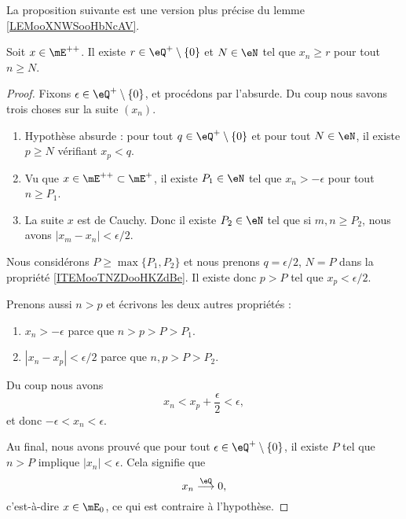 La proposition suivante est une version plus précise du lemme \ref{LEMooXNWSooHbNcAV}.
\begin{proposition}
	Soit \( x\in \mE^{++}\). Il existe \( r\in \eQ^+\setminus\{ 0 \}\) et \( N\in \eN\) tel que \( x_n\geq r\) pour tout \( n\geq N\).
\end{proposition}

\begin{proof}
	Fixons \( \epsilon\in \eQ^+\setminus\{ 0 \}\), et procédons par l'absurde. Du coup nous savons trois choses sur la suite \( (x_n)\).
	\begin{enumerate}
		\item       \label{ITEMooTNZDooHKZdBe}
		      Hypothèse absurde : pour tout \( q\in \eQ^+\setminus\{ 0 \}\) et pour tout \( N\in \eN\), il existe \( p\geq N\) vérifiant \( x_p<q\).
		\item
		      Vu que \( x\in \mE^{++}\subset \mE^+\), il existe \( P_1\in \eN\) tel que \( x_n>-\epsilon\) pour tout \( n\geq P_1\).
		\item
		      La suite \( x\) est de Cauchy. Donc il existe \( P_2\in \eN\) tel que si \( m,n\geq P_2\), nous avons \( | x_m-x_n |<\epsilon/2\).
	\end{enumerate}
	Nous considérons \( P\geq \max\{ P_1, P_2 \}\) et nous prenons \( q=\epsilon/2\), \( N=P\) dans la propriété \ref{ITEMooTNZDooHKZdBe}. Il existe donc \( p>P\) tel que \( x_p<\epsilon/2\).

	Prenons aussi \( n>p\) et écrivons les deux autres propriétés :
	\begin{enumerate}
		\item \( x_n>-\epsilon\) parce que \( n>p>P>P_1\).
		\item \( | x_n-x_p |<\epsilon/2\) parce que \( n,p>P>P_2\).
	\end{enumerate}
	Du coup nous avons
	\begin{equation}
		x_n<x_p+\frac{ \epsilon }{2}<\epsilon,
	\end{equation}
	et donc \( -\epsilon<x_n<\epsilon\).

	Au final, nous avons prouvé que pour tout \( \epsilon\in \eQ^+\setminus\{ 0 \}\), il existe \( P\) tel que \( n>P\) implique \( | x_n |<\epsilon\). Cela signifie que
	\begin{equation}
		x_n\stackrel{\eQ}{\longrightarrow}0,
	\end{equation}
	c'est-à-dire \( x\in \mE_0\), ce qui est contraire à l'hypothèse.
\end{proof}


